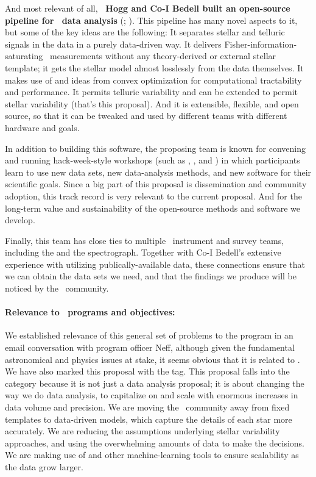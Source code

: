 \documentclass[12pt, letterpaper]{article}
\begin{document}
And most relevant of all, \textbf{\PI\ Hogg and Co-I Bedell built an open-source
pipeline for \EPRV\ data analysis} (\wobble; \citealt{Bedell2019}).
This pipeline has many novel aspects to it, but some of the key ideas
are the following: 
It separates stellar and telluric signals in the data in a purely
data-driven way.
It delivers Fisher-information-saturating \RV\ measurements without any
theory-derived or external stellar template; it gets the stellar model
almost losslessly from the data themselves.
It makes use of  and ideas from convex optimization
for computational tractability and performance.
It permits telluric variability and can be extended to permit stellar
variability (that's this proposal).
And it is extensible, flexible, and open source, so that it can be
tweaked and used by different teams with different hardware and goals.

In addition to building this software, the proposing team is known for
convening and running hack-week-style workshops (such as , , and ) in which participants learn to use new data sets, new
data-analysis methods, and new software for their scientific goals.
Since a big part of this proposal is dissemination and community adoption,
this track record is very relevant to the current proposal.
And for the long-term value and sustainability of the open-source methods
and software we develop.

Finally, this team has close ties to multiple \EPRV\ instrument and survey
teams, including the  and the 
spectrograph. Together with Co-I Bedell's extensive experience with utilizing 
publically-available  data, these connections ensure that 
we can obtain the data sets we need, and that the findings we produce will 
be noticed by the \EPRV\ community.

\paragraph{Relevance to \NSF\ programs and objectives:}

We established relevance of this general set of problems to the  program
in an email conversation with program officer Neff, although given the fundamental
astronomical and physics issues at stake, it seems obvious that it is related to
.
We have also marked this proposal with the  tag.
This proposal falls into the  category because it is not just a data
analysis proposal; it is about changing the way we do data analysis, to capitalize on
and scale with enormous increases in data volume and precision.
We are moving the \EPRV\ community away from fixed templates to data-driven models,
which capture the details of each star more accurately.
We are reducing the assumptions underlying stellar variability approaches, and using
the overwhelming amounts of data to make the decisions.
We are making use of  and other machine-learning tools to ensure
scalability as the data grow larger.
\end{document}

